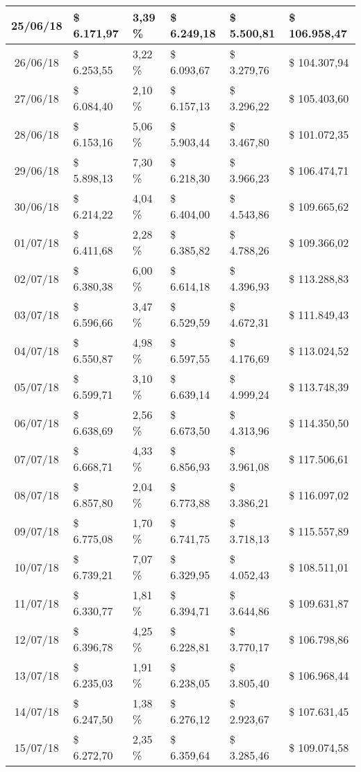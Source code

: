 \begin{small}
\begin{longtable}{|c|l|l|l|l|l|}
25/06/18 & \$ 6.171,97 & 3,39 \% & \$ 6.249,18 & \$ 5.500,81 & \$ 106.958,47 \\ \hline
26/06/18 & \$ 6.253,55 & 3,22 \% & \$ 6.093,67 & \$ 3.279,76 & \$ 104.307,94 \\ \hline
27/06/18 & \$ 6.084,40 & 2,10 \% & \$ 6.157,13 & \$ 3.296,22 & \$ 105.403,60 \\ \hline
28/06/18 & \$ 6.153,16 & 5,06 \% & \$ 5.903,44 & \$ 3.467,80 & \$ 101.072,35 \\ \hline
29/06/18 & \$ 5.898,13 & 7,30 \% & \$ 6.218,30 & \$ 3.966,23 & \$ 106.474,71 \\ \hline
30/06/18 & \$ 6.214,22 & 4,04 \% & \$ 6.404,00 & \$ 4.543,86 & \$ 109.665,62 \\ \hline
01/07/18 & \$ 6.411,68 & 2,28 \% & \$ 6.385,82 & \$ 4.788,26 & \$ 109.366,02 \\ \hline
02/07/18 & \$ 6.380,38 & 6,00 \% & \$ 6.614,18 & \$ 4.396,93 & \$ 113.288,83 \\ \hline
03/07/18 & \$ 6.596,66 & 3,47 \% & \$ 6.529,59 & \$ 4.672,31 & \$ 111.849,43 \\ \hline
04/07/18 & \$ 6.550,87 & 4,98 \% & \$ 6.597,55 & \$ 4.176,69 & \$ 113.024,52 \\ \hline
05/07/18 & \$ 6.599,71 & 3,10 \% & \$ 6.639,14 & \$ 4.999,24 & \$ 113.748,39 \\ \hline
06/07/18 & \$ 6.638,69 & 2,56 \% & \$ 6.673,50 & \$ 4.313,96 & \$ 114.350,50 \\ \hline
07/07/18 & \$ 6.668,71 & 4,33 \% & \$ 6.856,93 & \$ 3.961,08 & \$ 117.506,61 \\ \hline
08/07/18 & \$ 6.857,80 & 2,04 \% & \$ 6.773,88 & \$ 3.386,21 & \$ 116.097,02 \\ \hline
09/07/18 & \$ 6.775,08 & 1,70 \% & \$ 6.741,75 & \$ 3.718,13 & \$ 115.557,89 \\ \hline
10/07/18 & \$ 6.739,21 & 7,07 \% & \$ 6.329,95 & \$ 4.052,43 & \$ 108.511,01 \\ \hline
11/07/18 & \$ 6.330,77 & 1,81 \% & \$ 6.394,71 & \$ 3.644,86 & \$ 109.631,87 \\ \hline
12/07/18 & \$ 6.396,78 & 4,25 \% & \$ 6.228,81 & \$ 3.770,17 & \$ 106.798,86 \\ \hline
13/07/18 & \$ 6.235,03 & 1,91 \% & \$ 6.238,05 & \$ 3.805,40 & \$ 106.968,44 \\ \hline
14/07/18 & \$ 6.247,50 & 1,38 \% & \$ 6.276,12 & \$ 2.923,67 & \$ 107.631,45 \\ \hline
15/07/18 & \$ 6.272,70 & 2,35 \% & \$ 6.359,64 & \$ 3.285,46 & \$ 109.074,58 \\ \hline

\end{longtable}
\end{small}
